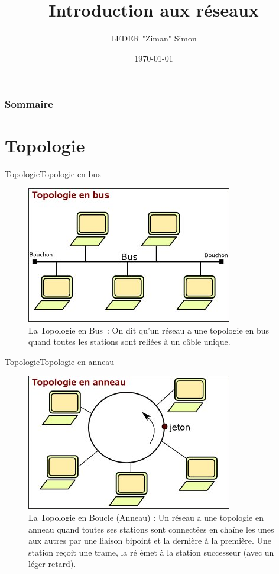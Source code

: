 \documentclass{beamer}
\title{Introduction aux réseaux}
\author{LEDER "Ziman" Simon}
\institute{Rezoleo\\}
\date{\today}
\begin{document}
	
	\maketitle

	\begin{frame}
		\frametitle{Sommaire} 
		\tableofcontents
	\end{frame}

\section{Topologie}

	\begin{frame}{Topologie}{Topologie en bus}
		\begin{figure} 
			\includegraphics[scale = 0.7]{Bus.jpg}\\ 
			La Topologie en Bus : On dit qu’un réseau a une topologie en bus quand toutes les stations sont reliées à un câble unique.
		\end{figure}
	\end{frame}

	\begin{frame}{Topologie}{Topologie en anneau}
		\begin{figure} 
			\includegraphics[scale = 0.7]{Anneau.jpg}\\
			La Topologie en Boucle (Anneau) : Un réseau a une topologie en anneau quand toutes ses stations sont connectées en chaîne les unes aux autres par une liaison bipoint et la dernière à la première. Une station reçoit une trame, la ré émet à la station successeur (avec un léger retard).
		\end{figure}
	\end{frame}
\end{document}
